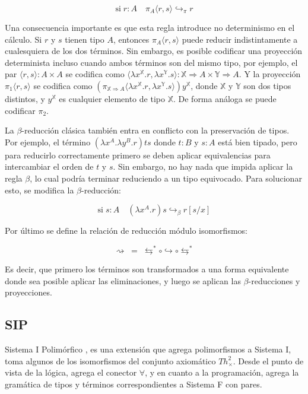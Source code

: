 \documentclass[]{report}
\begin{document}
	\[ \text{si} \; r:A \quad \pi_A \langle r, s \rangle \hookrightarrow_{\pi} r \]
	
	Una consecuencia importante es que esta regla introduce no determinismo en el cálculo.
	Si $r$ y $s$ tienen tipo $A$, entonces $\pi_A \langle r, s \rangle$ puede reducir indistintamente a cualesquiera de los dos términos.
	Sin embargo, es posible codificar una proyección determinista incluso cuando ambos términos son del mismo tipo, por ejemplo, el par $\langle r, s \rangle: A \times A$
	se codifica como $\langle \lambda x^\mathbb{X}.r, \lambda x^\mathbb{Y}.s \rangle : \mathbb{X} \Rightarrow A \times \mathbb{Y} \Rightarrow A$.
	Y la proyección $\pi_1 \langle r, s \rangle$ se codifica como $(\pi_{\mathbb{X} \Rightarrow A} \langle \lambda x^\mathbb{X}.r, \lambda x^\mathbb{Y}.s \rangle) y^\mathbb{X}$, donde $\mathbb{X}$ y $\mathbb{Y}$ son dos tipos distintos, y $y^\mathbb{X}$ es cualquier elemento de tipo $\mathbb{X}$.
	De forma análoga se puede codificar $\pi_2$.

	
	La $\beta$-reducción clásica también entra en conflicto con la preservación de tipos.
	Por ejemplo, el término $(\lambda x^A . \lambda y^B . r)ts$ donde $t:B$ y $s:A$ está bien tipado, pero para reducirlo correctamente primero se deben aplicar equivalencias para intercambiar el orden de $t$ y $s$.
	Sin embargo, no hay nada que impida aplicar la regla $\beta$, lo cual podría terminar reduciendo a un tipo equivocado.
	Para solucionar esto, se modifica la $\beta$-reducción:
	
	\[ \text{si} \; s:A \quad (\lambda x^A.r) s \hookrightarrow_{\beta} r[s/x] \]
	
	Por último se define la relación de reducción módulo isomorfismos:
	
	\[ \rightsquigarrow \; = \; \leftrightarrows^* \circ \hookrightarrow \circ \leftrightarrows^* \]
	
	Es decir, que primero los términos son transformados a una forma equivalente donde sea posible aplicar las eliminaciones, y luego se aplican las $\beta$-reducciones y proyecciones.
	
	
	\subsection{SIP}
	Sistema I Polimórfico \cite{sip}, es una extensión que agrega polimorfismos a Sistema I, toma algunos de los isomorfismos del conjunto axiomático $Th^2_\times$.
	Desde el punto de vista de la lógica, agrega el conector $\forall$, y en cuanto a la programación, agrega la gramática de tipos y términos correspondientes a Sistema F con pares.
	
\end{document}
